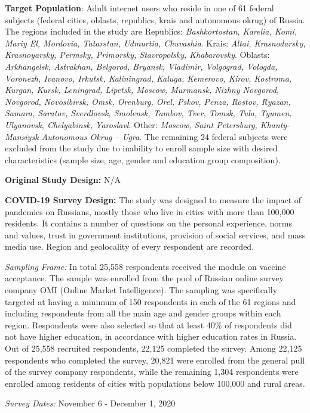 \documentclass[
  12pt,
]{article}
\begin{document}
\textbf{Target Population}: Adult internet users who reside in one of 61 federal subjects (federal cities, oblasts, republics, krais and autonomous okrug) of Russia. The regions included in the study are Republics: \emph{Bashkortostan, Karelia, Komi, Mariy El, Mordovia, Tatarstan, Udmurtia, Chuvashia}. Krais: \emph{Altai, Krasnodarsky, Krasnoyarsky, Permsky, Primorsky, Stavropolsky, Khabarovsky}. Oblasts: \emph{Arkhangelsk, Astrakhan, Belgorod, Bryansk, Vladimir, Volgograd, Vologda, Voronezh, Ivanovo, Irkutsk, Kaliningrad, Kaluga, Kemerovo, Kirov, Kostroma, Kurgan, Kursk, Leningrad, Lipetsk, Moscow, Murmansk, Nizhny Novgorod, Novgorod, Novosibirsk, Omsk, Orenburg, Orel, Pskov, Penza, Rostov, Ryazan, Samara, Saratov, Sverdlovsk, Smolensk, Tambov, Tver, Tomsk, Tula, Tyumen, Ulyanovsk, Chelyabinsk, Yaroslavl}. Other: \emph{Moscow, Saint Petersburg, Khanty-Mansiysk Autonomous Okrug -- Ugra}. The remaining 24 federal subjects were excluded from the study due to inability to enroll sample size with desired characteristics (sample size, age, gender and education group composition).

\textbf{Original Study Design:} N/A

\textbf{COVID-19 Survey Design:} The study was designed to measure the impact of pandemics on Russians, mostly those who live in cities with more than 100,000 residents. It contains a number of questions on the personal experience, norms and values, trust in government institutions, provision of social services, and mass media use. Region and geolocality of every respondent are recorded.

\emph{Sampling Frame:} In total 25,558 respondents received the module on vaccine acceptance. The sample was enrolled from the pool of Russian online survey company OMI (Online Market Intelligence). The sampling was specifically targeted at having a minimum of 150 respondents in each of the 61 regions and including respondents from all the main age and gender groups within each region. Respondents were also selected so that at least 40\% of respondents did not have higher education, in accordance with higher education rates in Russia. Out of 25,558 recruited respondents, 22,125 completed the survey. Among 22,125 respondents who completed the survey, 20,821 were enrolled from the general pull of the survey company respondents, while the remaining 1,304 respondents were enrolled among residents of cities with populations below 100,000 and rural areas.

\emph{Survey Dates:} November 6 - December 1, 2020
\end{document}

